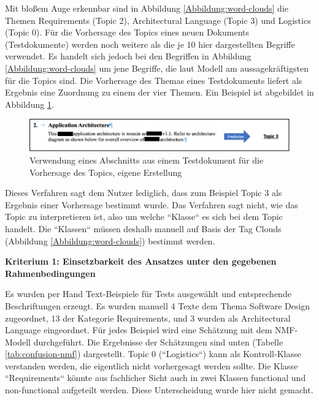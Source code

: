 Mit bloßem Auge erkennbar sind in Abbildung \ref{Abbildung:word-clouds} die Themen Requirements (Topic 2), Architectural Language (Topic 3) und Logistics (Topic 0). Für die Vorhersage des Topics eines neuen Dokuments (Testdokumente) werden noch weitere als die je 10 hier dargestellten Begriffe verwendet. Es handelt sich jedoch bei den Begriffen in Abbildung \ref{Abbildung:word-clouds} um jene Begriffe, die laut Modell am aussagekräftigsten für die Topics sind. Die Vorhersage des Themas eines Testdokuments liefert als Ergebnis eine Zuordnung zu einem der vier Themen. Ein Beispiel ist abgebildet in Abbildung \ref{Abbildung:nmf-inf}.

\begin{figure}[h]
\centering
\includegraphics[scale=0.95]{content/pics/Picture_19.png}
\caption{Verwendung eines Abschnitts aus einem Testdokument für die Vorhersage des Topics, eigene Erstellung}
\label{Abbildung:nmf-inf}
\end{figure}
 
Dieses Verfahren sagt dem Nutzer lediglich, dass zum Beispiel Topic 3 als Ergebnis einer Vorhersage bestimmt wurde. Das Verfahren sagt nicht, wie das Topic zu interpretieren ist, also um welche ``Klasse`` es sich bei dem Topic handelt. Die ``Klassen`` müssen deshalb manuell auf Basis der Tag Clouds (Abbildung \ref{Abbildung:word-clouds}) bestimmt werden.

{\bf Kriterium 1: Einsetzbarkeit des Ansatzes unter den gegebenen Rahmenbedingungen}

Es wurden per Hand Text-Beispiele für Tests ausgewählt und entsprechende Beschriftungen erzeugt. Es wurden manuell 4 Texte dem Thema Software Design zugeordnet, 13 der Kategorie Requirements, und 3 wurden als Architectural Language eingeordnet. Für jedes Beispiel wird eine Schätzung mit dem NMF-Modell durchgeführt. Die Ergebnisse der Schätzungen sind unten (Tabelle \ref{tab:confusion-nmf}) dargestellt. Topic 0 (``Logistics``) kann als Kontroll-Klasse verstanden werden, die eigentlich nicht vorhergesagt werden sollte. Die Klasse ``Requirements`` könnte aus fachlicher Sicht auch in zwei Klassen functional und non-functional aufgeteilt werden. Diese Unterscheidung wurde hier nicht gemacht.

